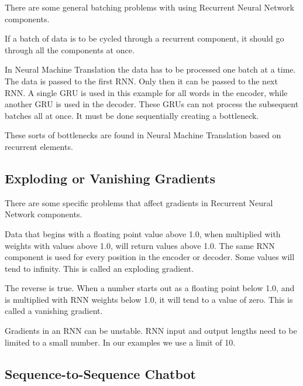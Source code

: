 \label{section-gru-batching-problems}

There are some general batching problems with using Recurrent Neural Network components.

If a batch of data is to be cycled through a recurrent component, it should go through all the components at once.  


In Neural Machine Translation the data has to be processed one batch at a time. The data is passed to the first RNN. Only then it can be passed to the next RNN. A single GRU is used in this example for all words in the encoder, while another GRU is used in the decoder. These GRUs can not process the subsequent batches all at once. It must be done sequentially creating a bottleneck. 


These sorts of bottlenecks are found in Neural Machine Translation based on recurrent elements.

\subsection{Exploding or Vanishing Gradients}

\label{section-gru-gradient-problems}

There are some specific problems that affect gradients in Recurrent Neural Network components.

Data that begins with a floating point value above 1.0, when multiplied with weights with  values above 1.0, will return values above 1.0. The same RNN component is used for every position in the encoder or decoder. Some values will tend to infinity. This is called an exploding gradient. 


The reverse is true. When a number starts out as a floating point below 1.0, and is multiplied with RNN weights below 1.0, it will tend to a value of zero. This is called a vanishing gradient.


Gradients in an RNN can be unstable. RNN input and output lengths need to be limited to a small number. In our examples we use a limit of 10.

\subsection{Sequence-to-Sequence Chatbot}

